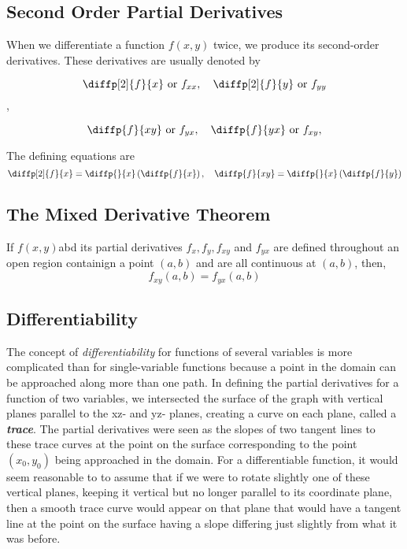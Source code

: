 \documentclass[12pt,a4paper,draft]{article}
\newenvironment{theorem}{\begin{theorembox}}{\end{theorembox}\vspace{1\baselineskip}}
\newcommand{\fxy}{\(f(x,y)\)}
\begin{document}
\subsection{Second Order Partial Derivatives}

When we differentiate a function \(f(x,y)\) twice, we produce its second-order derivatives. These derivatives are usually denoted by

\[\diffp[2]{f}{x} \ \text{or} \ f_{xx}, \quad \diffp[2]{f}{y} \ \text{or} \ f_{yy} \],

\[\diffp{f}{{x}{y}} \ \text{or} \ f_{yx}, \quad \diffp{f}{{y}{x}} \ \text{or} \ f_{xy},\]

The defining equations are
\[\diffp[2]{f}{x} = \diffp{}{x}\left(\diffp{f}{x}\right), \quad \diffp{f}{{x}{y}} = \diffp{}{x}\left(\diffp{f}{y}\right)\]


\subsection{The Mixed Derivative Theorem}

\begin{theorem}
    If \fxy abd its partial derivatives \(f_x, f_y, f_{xy}\) and \(f_{yx}\) are defined throughout an open region containign a point \((a,b)\) and are all continuous at  \((a,b)\), then,
    \[f_{xy}(a,b) = f_{yx}(a,b)\]
\end{theorem}

\newpage

\subsection{Differentiability}

The concept of \textit{differentiability} for functions of several variables is more complicated than for single-variable functions because a point in the domain can be approached along more than one path. 
In defining the partial derivatives for a function of two variables, we intersected the surface of the graph with vertical planes parallel to the xz- and yz- planes, creating a curve on each plane, called a \textit{\textbf{trace}}. The partial derivatives were seen as the slopes of two tangent lines to these trace curves at the point on the surface corresponding to the point \((x_0,y_0)\) being approached in the domain. For a differentiable function, it would seem reasonable to to assume that if we were to rotate slightly one of these vertical planes, keeping it vertical but no longer parallel to its coordinate plane, then a smooth trace curve would appear on that plane that would have a tangent line at the point on the surface having a slope differing just slightly from what it was before. 
\end{document}
